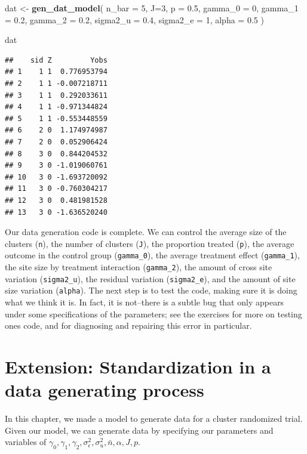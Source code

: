 \documentclass[
]{book}
\newenvironment{Shaded}{\begin{snugshade}}{\end{snugshade}}
\newcommand{\AttributeTok}[1]{\textcolor[rgb]{0.13,0.29,0.53}{#1}}
\newcommand{\DecValTok}[1]{\textcolor[rgb]{0.00,0.00,0.81}{#1}}
\newcommand{\FloatTok}[1]{\textcolor[rgb]{0.00,0.00,0.81}{#1}}
\newcommand{\FunctionTok}[1]{\textcolor[rgb]{0.13,0.29,0.53}{\textbf{#1}}}
\newcommand{\NormalTok}[1]{#1}
\newcommand{\OtherTok}[1]{\textcolor[rgb]{0.56,0.35,0.01}{#1}}
\begin{document}
\begin{Shaded}
\begin{Highlighting}[]
\NormalTok{dat }\OtherTok{\textless{}{-}} \FunctionTok{gen\_dat\_model}\NormalTok{( }\AttributeTok{n\_bar =} \DecValTok{5}\NormalTok{, }\AttributeTok{J=}\DecValTok{3}\NormalTok{, }\AttributeTok{p =} \FloatTok{0.5}\NormalTok{, }
                      \AttributeTok{gamma\_0 =} \DecValTok{0}\NormalTok{, }\AttributeTok{gamma\_1 =} \FloatTok{0.2}\NormalTok{, }\AttributeTok{gamma\_2 =} \FloatTok{0.2}\NormalTok{,}
                      \AttributeTok{sigma2\_u =} \FloatTok{0.4}\NormalTok{, }\AttributeTok{sigma2\_e =} \DecValTok{1}\NormalTok{,}
                      \AttributeTok{alpha =} \FloatTok{0.5}\NormalTok{ )}

\NormalTok{dat}
\end{Highlighting}
\end{Shaded}

\begin{verbatim}
##    sid Z         Yobs
## 1    1 1  0.776953794
## 2    1 1 -0.007218711
## 3    1 1  0.292033611
## 4    1 1 -0.971344824
## 5    1 1 -0.553448559
## 6    2 0  1.174974987
## 7    2 0  0.052906424
## 8    3 0  0.844204532
## 9    3 0 -1.019060761
## 10   3 0 -1.693720092
## 11   3 0 -0.760304217
## 12   3 0  0.481981528
## 13   3 0 -1.636520240
\end{verbatim}

Our data generation code is complete.
We can control the average size of the clusters (\texttt{n}), the number of clusters (\texttt{J}), the proportion treated (\texttt{p}), the average outcome in the control group (\texttt{gamma\_0}), the average treatment effect (\texttt{gamma\_1}), the site size by treatment interaction (\texttt{gamma\_2}), the amount of cross site variation (\texttt{sigma2\_u}), the residual variation (\texttt{sigma2\_e}), and the amount of site size variation (\texttt{alpha}).
The next step is to test the code, making sure it is doing what we think it is.
In fact, it is not--there is a subtle bug that only appears under some specifications of the parameters; see the exercises for more on testing ones code, and for diagnosing and repairing this error in particular.

\section{Extension: Standardization in a data generating process}\label{case-cluster-stand}

In this chapter, we made a model to generate data for a cluster randomized trial.
Given our model, we can generate data by specifying our parameters and variables of \(\gamma_{0}, \gamma_{1}, \gamma_{2}, \sigma^2_\epsilon, \sigma^2_u, \bar{n}, \alpha, J, p\).
\end{document}
